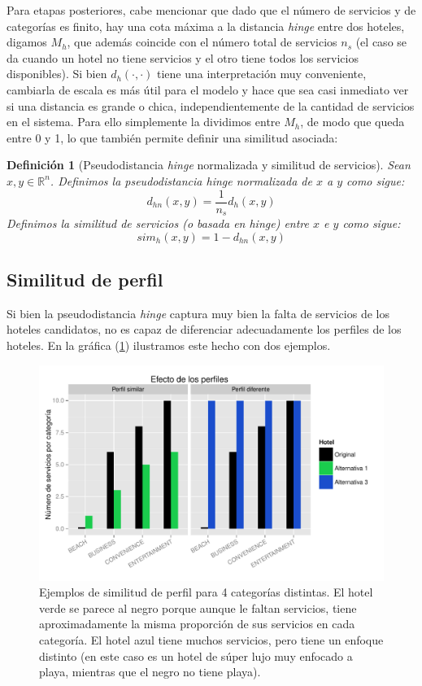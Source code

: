 \documentclass[12pt]{report}
\newcommand{\R}{\mathbb{R}}
\newtheorem{defn}{Definici\'on}[chapter]
\begin{document}
Para etapas posteriores, cabe mencionar que dado que el número de servicios y de categorías es finito, hay una cota máxima a la distancia \emph{hinge} entre dos hoteles, digamos $M_h$, que además coincide con el número total de servicios $n_s$ (el caso se da cuando un hotel no tiene servicios y el otro tiene todos los servicios disponibles). Si bien $d_h(\cdot, \cdot)$ tiene una interpretación muy conveniente, cambiarla de escala es más útil para el modelo y hace que sea casi inmediato ver si una distancia es grande o chica, independientemente de la cantidad de servicios en el sistema. Para ello simplemente la dividimos entre $M_h$, de modo que queda entre 0 y 1, lo que también permite definir una similitud asociada:
\begin{defn}[Pseudodistancia \emph{hinge} normalizada y similitud de servicios]
Sean $x, y \in \R^n$. Definimos la pseudodistancia \emph{hinge} normalizada de $x$ a $y$ como sigue:
\[
d_{hn}(x,y) = \frac{1}{n_s}d_h(x,y)
\]
Definimos la similitud de servicios (o basada en \emph{hinge}) entre $x$ e $y$ como sigue:
\[
sim_h(x,y) = 1 - d_{hn}(x,y)
\]
\end{defn}

\subsection*{Similitud de perfil}

Si bien la pseudodistancia \emph{hinge} captura muy bien la falta de servicios de los hoteles candidatos, no es capaz de diferenciar adecuadamente los perfiles de los hoteles. En la gráfica (\ref{simperf}) ilustramos este hecho con dos ejemplos.
\begin{figure}[ht]
	\centering
	\includegraphics[width=\textwidth]{imagenes/simperf.pdf}
	\caption{\label{simperf} Ejemplos de similitud de perfil para 4 categorías distintas. El hotel verde se parece al negro porque aunque le faltan servicios, tiene aproximadamente la misma proporción de sus servicios en cada categoría. El hotel azul tiene muchos servicios, pero tiene un enfoque distinto (en este caso es un hotel de súper lujo muy enfocado a playa, mientras que el negro no tiene playa).}
\end{figure}
\end{document}

